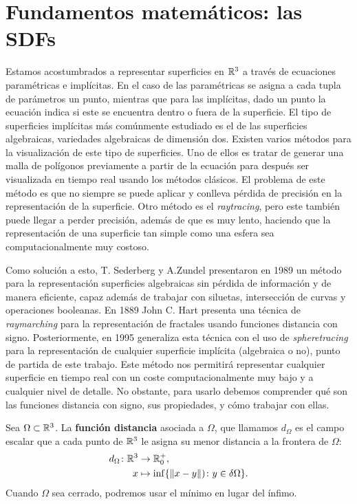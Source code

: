 \chapter{Fundamentos matemáticos: las SDFs}
Estamos acostumbrados a representar superficies en $\mathbb{R}^3$ a través de ecuaciones paramétricas e implícitas. En el caso de las paramétricas se asigna a cada tupla de parámetros un punto, mientras que para las implícitas, dado un punto la ecuación indica si este se encuentra dentro o fuera de la superficie. El tipo de superficies implícitas más comúnmente estudiado es el de las superficies algebraicas, variedades algebraicas de dimensión dos. Existen varios métodos para la visualización de este tipo de superficies. Uno de ellos es tratar de generar una malla de polígonos previamente a partir de la ecuación para después ser visualizada en tiempo real usando los métodos clásicos. El problema de este método es que no siempre se puede aplicar y conlleva pérdida de precisión en la representación de la superficie. Otro método es el \textit{raytracing}, pero este también puede llegar a perder precisión, además de que es muy lento, haciendo que la representación de una superficie tan simple como una esfera sea computacionalmente muy costoso.\newline

Como solución a esto, T. Sederberg y A.Zundel \cite{Sederberg1989ScanLD} presentaron en 1989 un método para la representación superficies algebraicas sin pérdida de información y de manera eficiente, capaz además de trabajar con siluetas, intersección de curvas y operaciones booleanas. En 1889 John C. Hart \cite{hart2} presenta una técnica de \textit{raymarching} para la representación de fractales usando funciones distancia con signo. Posteriormente, en 1995 \cite{hart} generaliza esta técnica con el uso de \textit{spheretracing} para la representación de cualquier superficie implícita (algebraica o no), punto de partida de este trabajo. Este método nos permitirá representar cualquier superficie en tiempo real con un coste computacionalmente muy bajo y a cualquier nivel de detalle. No obstante, para usarlo debemos comprender qué son las funciones distancia con signo, sus propiedades, y cómo trabajar con ellas.

\begin{definicion}\label{def:sdf}
  Sea $\Omega \subset \mathbb{R}^3$. La \textbf{función distancia} asociada a $\Omega$, que llamamos $d_{\Omega}$ es el campo escalar que a cada punto de $\mathbb{R}^3$ le asigna su menor distancia a la frontera de $\Omega$:
    \begin{align*}
          d_{\Omega} \colon \mathbb{R}^3 &\to \mathbb{R}_0^+,\\
          x &\mapsto \inf\{\Vert x-y\Vert) \colon y \in \delta\Omega\}.
    \end{align*}
    Cuando $\Omega$ sea cerrado, podremos usar el mínimo en lugar del ínfimo.
\end{definicion}

